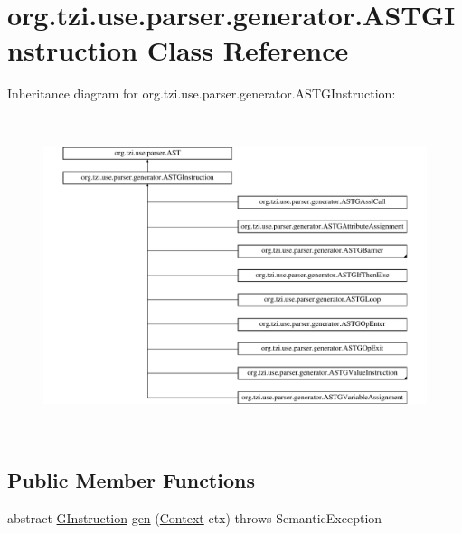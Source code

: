 \hypertarget{classorg_1_1tzi_1_1use_1_1parser_1_1generator_1_1_a_s_t_g_instruction}{\section{org.\-tzi.\-use.\-parser.\-generator.\-A\-S\-T\-G\-Instruction Class Reference}
\label{classorg_1_1tzi_1_1use_1_1parser_1_1generator_1_1_a_s_t_g_instruction}
}
Inheritance diagram for org.\-tzi.\-use.\-parser.\-generator.\-A\-S\-T\-G\-Instruction\-:\begin{figure}[H]
\begin{center}
\leavevmode
\includegraphics[height=9.390244cm]{classorg_1_1tzi_1_1use_1_1parser_1_1generator_1_1_a_s_t_g_instruction}
\end{center}
\end{figure}
\subsection*{Public Member Functions}
\begin{DoxyCompactItemize}
\item 
abstract \hyperlink{interfaceorg_1_1tzi_1_1use_1_1gen_1_1assl_1_1statics_1_1_g_instruction}{G\-Instruction} \hyperlink{classorg_1_1tzi_1_1use_1_1parser_1_1generator_1_1_a_s_t_g_instruction_ab5cde2a68713dcedb3dcb66bb075ed9e}{gen} (\hyperlink{classorg_1_1tzi_1_1use_1_1parser_1_1_context}{Context} ctx)  throws Semantic\-Exception
\end{DoxyCompactItemize}


